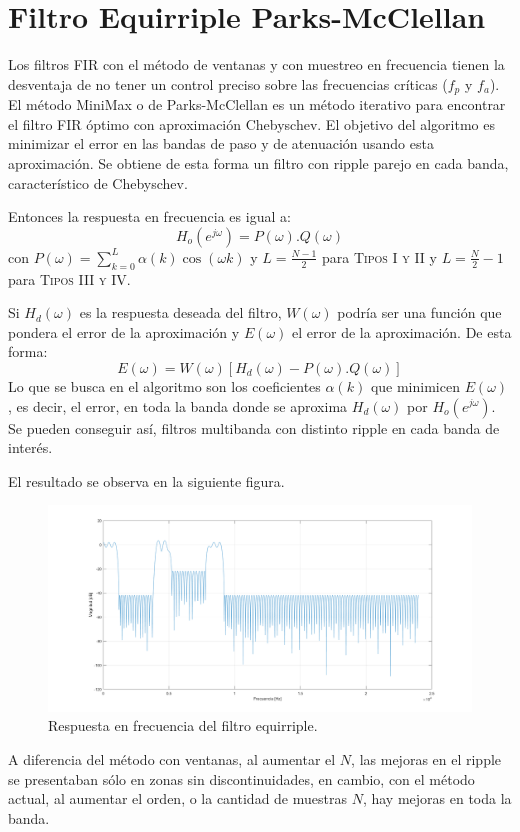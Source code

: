 \section{Filtro Equirriple Parks-McClellan}

Los filtros FIR con el método de ventanas y con muestreo en frecuencia tienen la desventaja de no tener un control preciso sobre las frecuencias críticas ($f_p$ y $f_a$). El método MiniMax o de Parks-McClellan es un método iterativo para encontrar el filtro FIR óptimo con aproximación Chebyschev. El objetivo del algoritmo es minimizar el error en las bandas de paso y de atenuación usando esta aproximación. Se obtiene de esta forma un filtro con ripple parejo en cada banda, característico de Chebyschev.
\par Entonces la respuesta en frecuencia es igual a:
\begin{equation}
  H_o\left(e^{j\omega}\right)=P(\omega).Q(\omega)
\end{equation}
con $P(\omega)=\sum_{k=0}^L\alpha(k)\cos(\omega k)$ y $L=\frac{N-1}{2}$ para \textsc{Tipos I y II} y $L=\frac{N}{2}-1$ para \textsc{Tipos III y IV}.
\par Si $H_d(\omega)$ es la respuesta deseada del filtro, $W(\omega)$ podría ser una función que pondera el error de la aproximación y $E(\omega)$ el error de la aproximación. De esta forma:
\begin{equation}
  E(\omega)=W(\omega)[H_d(\omega)-P(\omega).Q(\omega)]
\end{equation}
Lo que se busca en el algoritmo son los coeficientes $\alpha(k)$ que minimicen $E(\omega)$, es decir, el error, en toda la banda donde se aproxima $H_d(\omega)$ por $H_o\left(e^{j\omega}\right)$. Se pueden conseguir así, filtros multibanda con distinto ripple en cada banda de interés.
\par El resultado se observa en la siguiente figura.
\begin{figure}[H]
  \includegraphics[scale=.35]{./images/4/pm.png}
  \caption{Respuesta en frecuencia del filtro equirriple.}
\end{figure}
A diferencia del método con ventanas, al aumentar el $N$, las mejoras en el ripple se presentaban sólo en zonas sin discontinuidades, en cambio, con el método actual, al aumentar el orden, o la cantidad de muestras $N$, hay mejoras en toda la banda.
